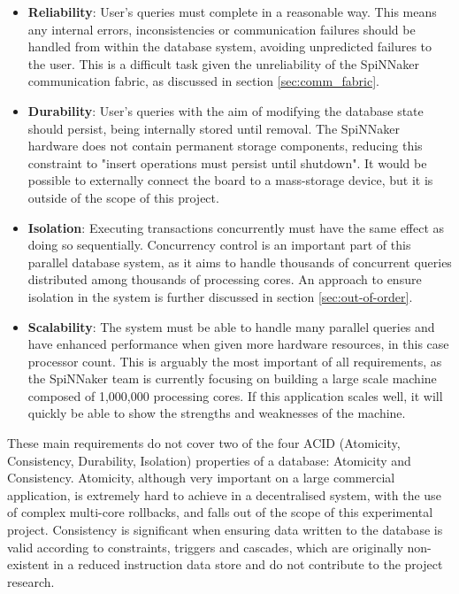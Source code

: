 \begin{itemize}
	\item \textbf{Reliability}: User's queries must complete in a reasonable way. This means any internal errors, inconsistencies or communication failures should be handled from within the database system, avoiding unpredicted failures to the user. This is a difficult task given the unreliability of the SpiNNaker communication fabric, as discussed in section \ref{sec:comm_fabric}.
	\item \textbf{Durability}: User's queries with the aim of modifying the database state should persist, being internally stored until removal. The SpiNNaker hardware does not contain permanent storage components, reducing this constraint to "insert operations must persist until shutdown". It would be possible to externally connect the board to a mass-storage device, but it is outside of the scope of this project.
	\item \textbf{Isolation}: Executing transactions concurrently must have the same effect as doing so sequentially. Concurrency control is an important part of this parallel database system, as it aims to handle thousands of concurrent queries distributed among thousands of processing cores. An approach to ensure isolation in the system is further discussed in section \ref{sec:out-of-order}.
	\item \textbf{Scalability}: The system must be able to handle many parallel queries and have enhanced performance when given more hardware resources, in this case processor count.	This is arguably the most important of all requirements, as the SpiNNaker team is currently focusing on building a large scale machine composed of 1,000,000 processing cores. If this application scales well, it will quickly be able to show the strengths and weaknesses of the machine.
\end{itemize}

These main requirements do not cover two of the four ACID (Atomicity, Consistency, Durability, Isolation) properties of a database: Atomicity and Consistency. Atomicity, although very important on a large commercial application, is extremely hard to achieve in a decentralised system, with the use of complex multi-core rollbacks, and falls out of the scope of this experimental project. Consistency is significant when ensuring data written to the database is valid according to constraints, triggers and cascades, which are originally non-existent in a reduced instruction data store and do not contribute to the project research.

